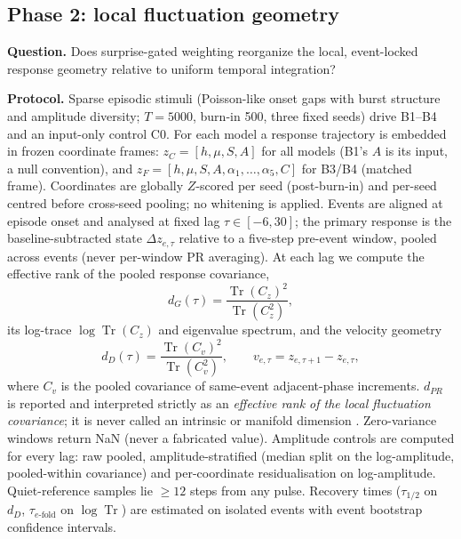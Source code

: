 \subsection{Phase 2: local fluctuation geometry}\label{sec:methods-phase2}

\textbf{Question.} Does surprise-gated weighting reorganize the local,
event-locked response geometry relative to uniform temporal integration?

\textbf{Protocol.} Sparse episodic stimuli (Poisson-like onset gaps with
burst structure and amplitude diversity; $T = 5000$, burn-in 500, three
fixed seeds) drive B1--B4 and an input-only control C0.  For each model a
response trajectory is embedded in frozen coordinate frames:
$z_C = [h,\mu,S,A]$ for all models (B1's $A$ is its input, a null
convention), and $z_F = [h,\mu,S,A,\alpha_1,\dots,\alpha_5,C]$ for B3/B4
(matched frame).  Coordinates are globally $Z$-scored per seed
(post-burn-in) and per-seed centred before cross-seed pooling; no
whitening is applied.  Events are aligned at episode onset and analysed
at fixed lag $\tau \in [-6, 30]$; the primary response is the
baseline-subtracted state $\Delta z_{e,\tau}$ relative to a five-step
pre-event window, pooled across events (never per-window PR averaging).
At each lag we compute the effective rank of the pooled response
covariance,
\begin{equation}
  d_G(\tau) = \frac{\operatorname{Tr}(C_z)^2}
  {\operatorname{Tr}(C_z^2)},
\end{equation}
its log-trace $\log\operatorname{Tr}(C_z)$ and eigenvalue spectrum, and
the velocity geometry
\begin{equation}
  d_D(\tau) = \frac{\operatorname{Tr}(C_v)^2}
  {\operatorname{Tr}(C_v^2)}, \qquad
  v_{e,\tau} = z_{e,\tau+1} - z_{e,\tau},
\end{equation}
where $C_v$ is the pooled covariance of same-event adjacent-phase
increments.  $d_{PR}$ is reported and interpreted strictly as an
\emph{effective rank of the local fluctuation covariance}; it is never
called an intrinsic or manifold dimension \citep{gaoganguli2015,
mazzucato2016,facco2017,chungabbott2021}.  Zero-variance windows return
NaN (never a fabricated value).  Amplitude controls are computed for
every lag: raw pooled, amplitude-stratified (median split on the
log-amplitude, pooled-within covariance) and per-coordinate
residualisation on log-amplitude.  Quiet-reference samples lie $\geq 12$
steps from any pulse.  Recovery times ($\tau_{1/2}$ on $d_D$,
$\tau_{e\text{-fold}}$ on $\log\operatorname{Tr}$) are estimated on
isolated events with event bootstrap confidence intervals.

